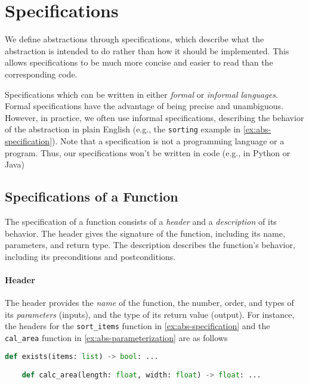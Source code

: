 \documentclass[oneside,11pt,dvipsnames]{book}
\begin{document}
\section{Specifications}\label{sec:specifications}

We define abstractions through specifications, which describe what the abstraction is intended to do rather than how it should be implemented. This allows specifications to be much more concise and easier to read than the corresponding code.

Specifications which can be written in either \emph{formal} or \emph{informal languages}. Formal specifications have the advantage of being precise and unambiguous. However, in practice, we often use informal specifications, describing the behavior of the abstraction in plain English (e.g., the \texttt{sorting} example in \autoref{ex:abs-specification}).  Note that a specification is not a programming language or a program. Thus, our specifications won’t be written in code (e.g., in Python or Java)

\subsection{Specifications of a Function}

The specification of a function consists of a \emph{header} and a \emph{description} of its behavior. 
The header gives the signature of the function, including its name, parameters, and return type. The description describes the function's behavior, including its preconditions and postconditions.

\paragraph{Header} The header provides the \emph{name} of the function, the number, order, and types of its \emph{parameters} (inputs), and the type of its return value (output). For instance, the headers for the \texttt{sort\_items} function in \autoref{ex:abs-specification} and the \texttt{cal\_area} function in \autoref{ex:abs-parameterization} are as follows

\begin{lstlisting}[language=Python, keywordstyle=\color{blue}, commentstyle=\color{green!60!black}, stringstyle=\color{red}, basicstyle=\ttfamily\scriptsize]
    def exists(items: list) -> bool: ...

    def calc_area(length: float, width: float) -> float: ...
\end{lstlisting}
\end{document}
